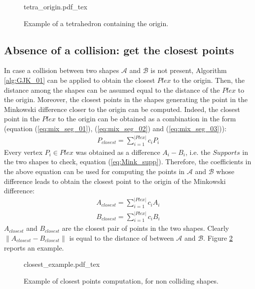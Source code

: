 \documentclass{article}
\begin{document}
\begin{figure}
	\centering
\def\svgwidth{0.35 \columnwidth}
{tetra_origin.pdf_tex} 
	\caption{Example of a tetrahedron containing the origin. }
	\label{fig:tetra_origin}
\end{figure}


\subsection{Absence of a collision: get the closest points}
\label{Sec:closest_points}

In case a collision between two shapes $\mathcal{A}$ and $\mathcal{B}$ is not present, Algorithm  \ref{alg:GJK_01} can be applied to obtain the closest $Plex$ to the origin. Then, the distance among the shapes can be assumed equal to the distance of the $Plex$ to the origin. Moreover, the closest points in the shapes generating the point in the Minkowski difference closer to the origin can be computed. Indeed, the closest point in the $Plex$ to the origin can be obtained as a combination in the form (equation (\ref{eq:mix_seg_01}), (\ref{eq:mix_seg_02}) and (\ref{eq:mix_seg_03})):
\begin{eqnarray}
P_{closest} = \sum_{i=1}^{\left | Plex \right |} c_i P_i
\end{eqnarray}
Every vertex $P_i \in Plex$ was obtained as a difference $A_i - B_i$, i.e. the $Supports$ in the two shapes to check, equation (\ref{eq:Mink_supp}). Therefore, the coefficients in the above equation can be used for computing the points in $\mathcal{A}$ and $\mathcal{B}$ whose difference leads to obtain the closest point to the origin of the Minkowski difference:
\begin{eqnarray}
A_{closest} = \sum_{i=1}^{\left | Plex \right |} c_i A_i \\
B_{closest} = \sum_{i=1}^{\left | Plex \right |} c_i B_i
\end{eqnarray}
$A_{closest}$ and $B_{closest}$ are the closest pair of points in the two shapes. Clearly $\left \| A_{closest} - B_{closest} \right \|$ is equal to the distance of between $\mathcal{A}$ and $\mathcal{B}$. Figure \ref{fig:closest_point} reports an example.

\begin{figure}
	\centering
\def\svgwidth{0.85 \columnwidth}
{closest_example.pdf_tex} 
	\caption{Example of closest points computation, for non colliding shapes. }
	\label{fig:closest_point}
\end{figure}
\end{document}
